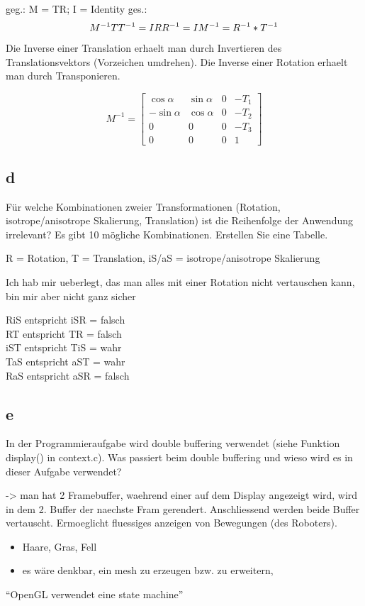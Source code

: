 \documentclass[12pt]{scrreprt}
\begin{document}
geg.: M = TR; I = Identity
ges.: \[M^{-1} \\
 \\
TT^{-1} = I \\
RR^{-1} = I \\
M^{-1} = R^{-1} * T^{-1}
\]

Die Inverse einer Translation erhaelt man durch Invertieren des Translationsvektors (Vorzeichen umdrehen).
Die Inverse einer Rotation erhaelt man durch Transponieren.

\[
 M^{-1} = \begin{bmatrix}
       \cos \alpha & \sin\alpha & 0 & -T_1 \\[0.3em]
       -\sin\alpha & \cos\alpha & 0 & -T_2 \\[0.3em]
       0           & 0          & 0 & -T_3 \\[0.3em]
       0           & 0          & 0 & 1
     \end{bmatrix}
\]

\subsection*{d}

Für welche Kombinationen zweier Transformationen (Rotation, isotrope/anisotrope Skalierung,
Translation) ist die Reihenfolge der Anwendung irrelevant? Es gibt 10 mögliche Kombinationen. Erstellen
Sie eine Tabelle.


R = Rotation, T = Translation,  iS/aS = isotrope/anisotrope Skalierung

Ich hab mir ueberlegt, das man alles mit einer Rotation nicht vertauschen kann, bin mir aber nicht ganz sicher

RiS entspricht iSR = falsch\\
RT entspricht TR   = falsch\\
iST entspricht TiS = wahr\\
TaS entspricht aST = wahr\\
RaS entspricht aSR = falsch\\


\subsection*{e}

In der Programmieraufgabe wird double buffering verwendet (siehe Funktion display() in
context.c). Was passiert beim double buffering und wieso wird es in dieser Aufgabe verwendet?

-> man hat 2 Framebuffer, waehrend einer auf dem Display angezeigt wird, wird in dem 2. Buffer der naechste Fram gerendert. Anschliessend werden beide Buffer vertauscht. Ermoeglicht fluessiges anzeigen von Bewegungen (des Roboters).



\begin{itemize}
  \item Haare, Gras, Fell
  \item es wäre denkbar, ein mesh zu erzeugen bzw. zu erweitern,
\end{itemize}


``OpenGL verwendet eine state machine''
\end{document}

